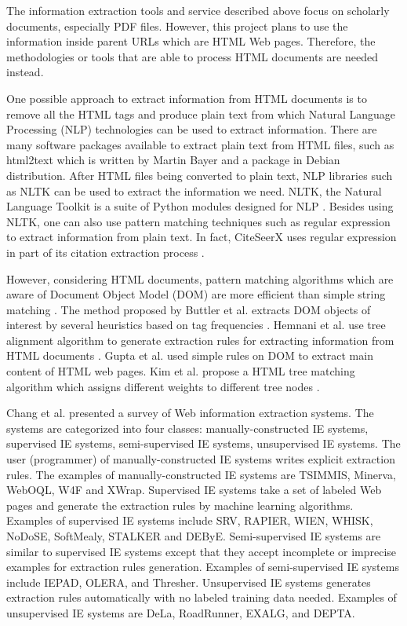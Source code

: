 \documentclass[prodmode]{acmsmall} %
\begin{document}
The information extraction tools and service described above focus on scholarly documents, especially PDF files. However, this project plans to use the information inside parent URLs which are HTML Web pages. Therefore, the methodologies or tools that are able to process HTML documents are needed instead.

One possible approach to extract information from HTML documents is to remove all the HTML tags and produce plain text from which Natural Language Processing (NLP) technologies can be used to extract information. There are many software packages available to extract plain text from HTML files, such as html2text which is written by Martin Bayer and a package in Debian distribution. After HTML files being converted to plain text, NLP libraries such as NLTK can be used to extract the information we need. NLTK, the Natural Language Toolkit is a suite of Python modules designed for NLP \cite{loper2002nltk} \cite{bird2006nltk}. Besides using NLTK, one can also use pattern matching techniques such as regular expression to extract information from plain text. In fact, CiteSeerX uses regular expression in part of its citation extraction process \cite{wu2014citeseerx}.

However, considering HTML documents, pattern matching algorithms which are aware of Document Object Model (DOM) are more efficient than simple string matching \cite{kim2007web}. The method proposed by Buttler et al. extracts DOM objects of interest by several heuristics based on tag frequencies \cite{buttler2001fully}. Hemnani et al. use tree alignment algorithm to generate extraction rules for extracting information from HTML documents \cite{hemnani2002information}. Gupta et al. used simple rules on DOM to extract main content of HTML web pages. Kim et al. propose a  HTML tree matching algorithm which assigns different weights to different tree nodes \cite{kim2007web}.

Chang et al. \cite{chang2006survey} presented a survey of Web information extraction systems. The systems are categorized into four classes: manually-constructed IE systems, supervised IE systems, semi-supervised IE systems, unsupervised IE systems. The user (programmer) of manually-constructed IE systems writes explicit extraction rules. The examples of manually-constructed IE systems are TSIMMIS, Minerva, WebOQL, W4F and XWrap. Supervised IE systems take a set of labeled Web pages and generate the extraction rules by machine learning algorithms. Examples of supervised IE systems include SRV, RAPIER, WIEN, WHISK, NoDoSE, SoftMealy, STALKER and DEByE. Semi-supervised IE systems are similar to supervised IE systems except that they accept incomplete or imprecise examples for extraction rules generation. Examples of semi-supervised IE systems include IEPAD, OLERA, and Thresher. Unsupervised IE systems generates extraction rules automatically with no labeled training data needed. Examples of unsupervised IE systems are DeLa, RoadRunner, EXALG, and DEPTA.
\end{document}
